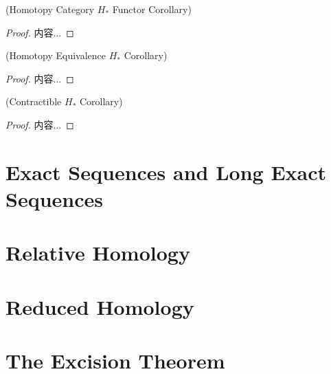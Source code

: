 \documentclass[Total.tex]{subfiles}
\begin{document}
				\begin{corollary}
					(Homotopy Category $H_*$ Functor Corollary)
				\end{corollary}
				\begin{proof}
					内容...
				\end{proof}
				
				\begin{corollary}
					(Homotopy Equivalence $H_*$ Corollary)
				\end{corollary}
				\begin{proof}
					内容...
				\end{proof}
				
				\begin{corollary}
					(Contractible $H_*$ Corollary)
				\end{corollary}
				\begin{proof}
					内容...
				\end{proof}
		\section{Exact Sequences and Long Exact Sequences}
		\section{Relative Homology}
		\section{Reduced Homology}
		\section{The Excision Theorem}
\end{document}
